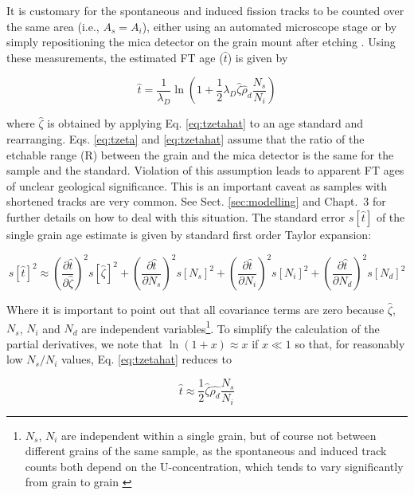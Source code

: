 \documentclass{article}
\begin{document}
It is customary for the spontaneous and induced fission tracks to be
counted over the same area (i.e., $A_s = A_i$), either using an
automated microscope stage \citep{smith1985,dumitru1993} or by simply
repositioning the mica detector on the grain mount after etching
\citep{jonckheere2003}.  Using these measurements, the estimated FT
age ($\hat{t}$) is given by

\begin{equation}
\hat{t} = \frac{1}{\lambda_D}
\ln \left(1+\frac{1}{2}\lambda_D\hat{\zeta}\hat{\rho}_d\frac{N_s}{N_i}\right)
\label{eq:tzetahat}
\end{equation}

where $\hat{\zeta}$ is obtained by applying Eq. \ref{eq:tzetahat} to
an age standard and rearranging.  Eqs. \ref{eq:tzeta} and
\ref{eq:tzetahat} assume that the ratio of the etchable range (R)
between the grain and the mica detector is the same for the sample and
the standard. Violation of this assumption leads to apparent FT ages
of unclear geological significance. This is an important caveat as
samples with shortened tracks are very common. See Sect.
\ref{sec:modelling} and Chapt.~3 \citep{ketcham2018} for further
details on how to deal with this situation.  The standard error
$s[\hat{t}]$ of the single grain age estimate is given by standard
first order Taylor expansion:

\begin{equation}
s[\hat{t}]^2 \approx 
\left(\frac{\partial\hat{t}}{\partial{\hat{\zeta}}}\right)^2 s[\hat{\zeta}]^2 +
\left(\frac{\partial\hat{t}}{\partial{N_s}}\right)^2 s[N_s]^2 +
\left(\frac{\partial\hat{t}}{\partial{N_i}}\right)^2 s[N_i]^2 +
\left(\frac{\partial\hat{t}}{\partial{N_d}}\right)^2 s[N_d]^2
\label{eq:Taylor}
\end{equation}

Where it is important to point out that all covariance terms are zero
because $\hat{\zeta}$, $N_s$, $N_i$ and $N_d$ are independent
variables\footnote{$N_s$, $N_i$ are independent within a single grain,
  but of course not between different grains of the same sample, as
  the spontaneous and induced track counts both depend on the
  U-concentration, which tends to vary significantly from grain to
  grain \citep{mcgee1979, johnson1979, green1981b, galbraith1981,
    carter1990}}.  To simplify the calculation of the partial
derivatives, we note that $\ln (1+x) \approx x$ if $x \ll 1$ so that,
for reasonably low $N_s/N_i$ values, Eq. \ref{eq:tzetahat}
reduces to

\begin{equation}
\hat{t} \approx \frac{1}{2}\hat{\zeta}\hat{\rho_d}\frac{N_s}{N_i}
\label{eq:tzetahatapprox}
\end{equation}
\end{document}
